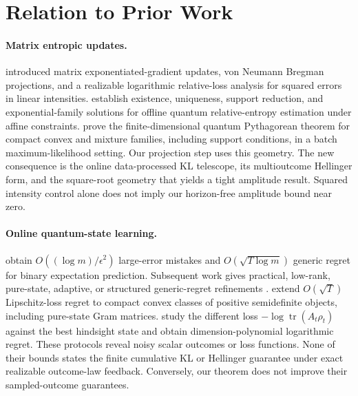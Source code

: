 \documentclass[twoside]{article}
\newcommand{\tr}{\operatorname{tr}}
\begin{document}
\section{Relation to Prior Work}
\label{sec:related}

\paragraph{Matrix entropic updates.} \citet{tsuda2005matrix} introduced matrix exponentiated-gradient updates, von Neumann Bregman projections, and a realizable logarithmic relative-loss analysis for squared errors in linear intensities. \citet{zorzi2014minimum} establish existence, uniqueness, support reduction, and exponential-family solutions for offline quantum relative-entropy estimation under affine constraints. \citet{sreekumar2026quantum} prove the finite-dimensional quantum Pythagorean theorem for compact convex and mixture families, including support conditions, in a batch maximum-likelihood setting. Our projection step uses this geometry. The new consequence is the online data-processed KL telescope, its multioutcome Hellinger form, and the square-root geometry that yields a tight amplitude result. Squared intensity control alone does not imply our horizon-free amplitude bound near zero.

\paragraph{Online quantum-state learning.} \citet{aaronson2018online} obtain $O((\log m)/\epsilon^2)$ large-error mistakes and $O(\sqrt{T\log m})$ generic regret for binary expectation prediction. Subsequent work gives practical, low-rank, pure-state, adaptive, or structured generic-regret refinements \citep{chen2020practical,yang2020revisiting,meyer2025pure,bansal2026structured}. \citet{bansal2024panoply} extend $O(\sqrt T)$ Lipschitz-loss regret to compact convex classes of positive semidefinite objects, including pure-state Gram matrices. \citet{tseng2025logarithmic} study the different loss $-\log\tr(A_t\rho_t)$ against the best hindsight state and obtain dimension-polynomial logarithmic regret. These protocols reveal noisy scalar outcomes or loss functions. None of their bounds states the finite cumulative KL or Hellinger guarantee under exact realizable outcome-law feedback. Conversely, our theorem does not improve their sampled-outcome guarantees.
\end{document}
